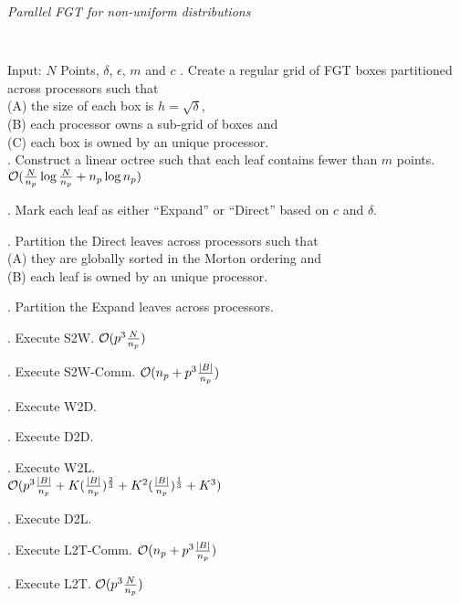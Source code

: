 \begin{algorithm}[!h]
\caption{ \label{a:ofgt}
\em Parallel FGT for non-uniform distributions}
{\tt
\begin{algorithmic}
\STATE Input: $N$ Points, $\delta$, $\epsilon$, $m$ and $c$
. Create a regular grid of FGT boxes partitioned across processors such that \\
 (A) the size of each box is $h = \sqrt{\delta}$, \\
 (B) each processor owns a sub-grid of boxes and \\
 (C) each box is owned by an unique processor. \\

. Construct a linear octree such that each leaf contains fewer than $m$ points. \\
\hfill $\mathcal{O}(\frac{N}{n_p} \log{\frac{N}{n_p}} + n_p \log{n_p})$

. Mark each leaf as either ``Expand'' or ``Direct'' based on $c$ and $\delta$.

. Partition the Direct leaves across processors such that \\
  (A) they are globally sorted in the Morton ordering and \\
  (B) each leaf is owned by an unique processor.

. Partition the Expand leaves across processors. 

. Execute S2W. \hfill $\mathcal{O}(p^3 \frac{N}{n_p})$

. Execute S2W-Comm. \hfill $\mathcal{O}(n_p + p^3\frac{|B|}{n_p})$

. Execute W2D. 

. Execute D2D. 

. Execute W2L. \\
 \hfill $\mathcal{O}(p^3 \frac{|B|}{n_p} + K (\frac{|B|}{n_p})^{\frac{2}{3}} + K^2(\frac{|B|}{n_p})^{\frac{1}{3}} + K^3 )$ 

. Execute D2L. 

. Execute L2T-Comm. \hfill $\mathcal{O}(n_p + p^3\frac{|B|}{n_p})$ 

. Execute L2T. \hfill $\mathcal{O}( p^3\frac{N}{n_p})$
\end{algorithmic}
}
\end{algorithm}


